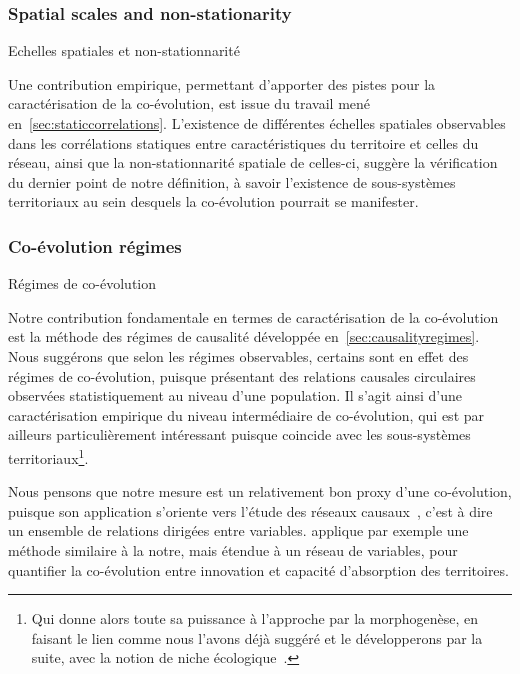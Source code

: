 \subsubsection{Spatial scales and non-stationarity}{Echelles spatiales et non-stationnarité}

Une contribution empirique, permettant d'apporter des pistes pour la caractérisation de la co-évolution, est issue du travail mené en~\ref{sec:staticcorrelations}. L'existence de différentes échelles spatiales observables dans les corrélations statiques entre caractéristiques du territoire et celles du réseau, ainsi que la non-stationnarité spatiale de celles-ci, suggère la vérification du dernier point de notre définition, à savoir l'existence de sous-systèmes territoriaux au sein desquels la co-évolution pourrait se manifester.




\subsubsection{Co-évolution régimes}{Régimes de co-évolution}

Notre contribution fondamentale en termes de caractérisation de la co-évolution est la méthode des régimes de causalité développée en~\ref{sec:causalityregimes}. Nous suggérons que selon les régimes observables, certains sont en effet des régimes de co-évolution, puisque présentant des relations causales circulaires observées statistiquement au niveau d'une population. Il s'agit ainsi d'une caractérisation empirique du niveau intermédiaire de co-évolution, qui est par ailleurs particulièrement intéressant puisque coincide avec les sous-systèmes territoriaux\footnote{Qui donne alors toute sa puissance à l'approche par la morphogenèse, en faisant le lien comme nous l'avons déjà suggéré et le développerons par la suite, avec la notion de niche écologique~\cite{holland2012signals}.}.

Nous pensons que notre mesure est un relativement bon proxy d'une co-évolution, puisque son application s'oriente vers l'étude des réseaux causaux~\cite{seth2005causal}, c'est à dire un ensemble de relations dirigées entre variables. \cite{castellacci2013dynamics} applique par exemple une méthode similaire à la notre, mais étendue à un réseau de variables, pour quantifier la co-évolution entre innovation et capacité d'absorption des territoires.


